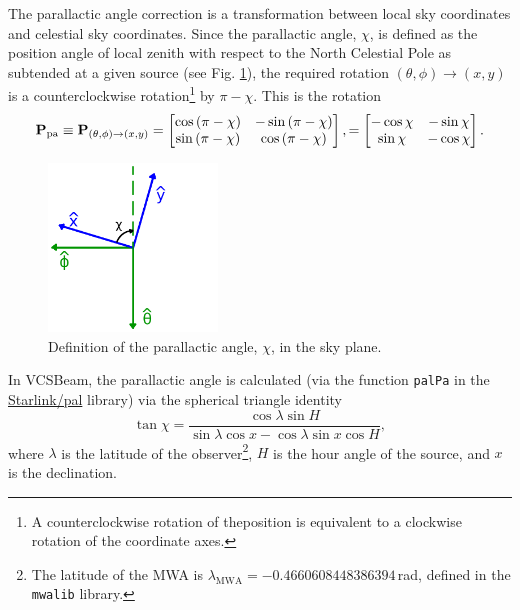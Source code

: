 \documentclass{book}
\newcommand{\vcsbeam}{{\sc VCSBeam}}
\newcommand{\transmat}[4]{\ensuremath{{\bf P}_{(#1,#2)\rightarrow(#3,#4)}}}
\newcommand{\pamat}{\ensuremath{{\bf P}_\text{pa}}}
\begin{document}
The parallactic angle correction is a transformation between local sky coordinates and celestial sky coordinates.
Since the parallactic angle,  $\chi$, is defined as the position angle of local zenith with respect to the North Celestial Pole as subtended at a given source (see Fig. \ref{fig:skyangles}), the required rotation $(\theta,\phi)\rightarrow(x,y)$ is a counterclockwise rotation\footnote{A counterclockwise rotation of theposition is equivalent to a clockwise rotation of the coordinate axes.} by $\pi - \chi$.
This is the rotation
\begin{equation}
    \pamat \equiv
    \transmat{\theta}{\phi}{x}{y}
        = \begin{bmatrix}
            \cos\left(\pi - \chi\right) & -\sin\left(\pi - \chi\right) \\
            \sin\left(\pi - \chi\right) &  \cos\left(\pi - \chi\right)
        \end{bmatrix},
        = \begin{bmatrix}
            -\cos\chi & -\sin\chi \\
             \sin\chi & -\cos\chi
        \end{bmatrix}.
\end{equation}
\begin{figure}[!th]
    \centering
    \includegraphics[width=0.4\textwidth]{skyangles.png}
    \caption{Definition of the parallactic angle, $\chi$, in the sky plane.}
    \label{fig:skyangles}
\end{figure}
In \vcsbeam{}, the parallactic angle is calculated (via the function \texttt{palPa} in the \href{https://github.com/Starlink/pal}{Starlink/pal} library) via the spherical triangle identity
\begin{equation}
    \tan \chi = \frac{\cos \lambda \sin H}{\sin\lambda \cos x - \cos \lambda \sin x \cos H},
\end{equation}
where $\lambda$ is the latitude of the observer\footnote{The latitude of the MWA is $\lambda_\text{MWA} = -0.4660608448386394\,$rad, defined in the \texttt{mwalib} library.}, $H$ is the hour angle of the source, and $x$ is the declination.
\end{document}
